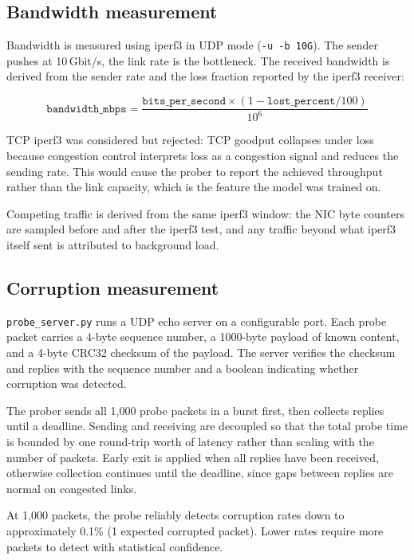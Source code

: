 \subsection{Bandwidth measurement}
\label{subsec:bw-measurement}

Bandwidth is measured using iperf3 in UDP mode (\texttt{-u -b 10G}).
The sender pushes at 10\,Gbit/s, the link rate is the bottleneck. The
received bandwidth is derived from the sender rate and the loss fraction
reported by the iperf3 receiver:

\[
    \texttt{bandwidth\_mbps} = \frac{\texttt{bits\_per\_second} \times
    (1 - \texttt{lost\_percent} / 100)}{10^6}
\]

TCP iperf3 was considered but rejected: TCP goodput collapses under loss
because congestion control interprets loss as a congestion signal and
reduces the sending rate. This would cause the prober to report the
achieved throughput rather than the link capacity, which is the feature
the model was trained on.

Competing traffic is derived from the same iperf3 window: the NIC byte
counters are sampled before and after the iperf3 test, and any traffic
beyond what iperf3 itself sent is attributed to background load.

\subsection{Corruption measurement}
\label{subsec:corruption-measurement}

\texttt{probe\_server.py} runs a UDP echo server on a configurable port.
Each probe packet carries a 4-byte sequence number, a 1000-byte payload
of known content, and a 4-byte CRC32 checksum of the payload. The server
verifies the checksum and replies with the sequence number and a boolean
indicating whether corruption was detected.

The prober sends all 1,000 probe packets in a burst first, then collects
replies until a deadline. Sending and receiving are decoupled so that the
total probe time is bounded by one round-trip worth of latency rather than
scaling with the number of packets. Early exit is applied when all replies
have been received, otherwise collection continues until the deadline,
since gaps between replies are normal on congested links.

At 1,000 packets, the probe reliably detects corruption rates down to
approximately 0.1\% (1 expected corrupted packet). Lower rates require
more packets to detect with statistical confidence.

